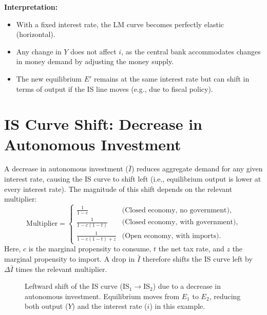 \noindent
\textbf{Interpretation:}
\begin{itemize}
    \item With a fixed interest rate, the LM curve becomes perfectly elastic (horizontal). 
    \item Any change in $Y$ does not affect $i$, as the central bank accommodates changes in money demand by adjusting the money supply.
    \item The new equilibrium $E'$ remains at the same interest rate but can shift in terms of output if the IS line moves (e.g., due to fiscal policy).
\end{itemize}

\section*{IS Curve Shift: Decrease in Autonomous Investment}
A decrease in autonomous investment (\(\bar{I}\)) reduces aggregate demand for any given interest rate, causing the IS curve to shift left (i.e., equilibrium output is lower at every interest rate). The magnitude of this shift depends on the relevant multiplier:
\[
\text{Multiplier} = 
\begin{cases}
\frac{1}{1-c} & \text{(Closed economy, no government)},\\[1em]
\frac{1}{1 - c(1-t)} & \text{(Closed economy, with government)},\\[1em]
\frac{1}{1 - c(1-t) + z} & \text{(Open economy, with imports)}.
\end{cases}
\]
Here, \(c\) is the marginal propensity to consume, \(t\) the net tax rate, and \(z\) the marginal propensity to import. A drop in \(\bar{I}\) therefore shifts the IS curve left by \(\Delta \bar{I}\) times the relevant multiplier.
\begin{figure}[h!]
    \centering
    \caption{Leftward shift of the IS curve (\(\text{IS}_1 \to \text{IS}_2\)) due to a decrease in autonomous investment. 
    Equilibrium moves from \(E_1\) to \(E_2\), reducing both output (\(Y\)) and the interest rate (\(i\)) in this example.}
\end{figure}

